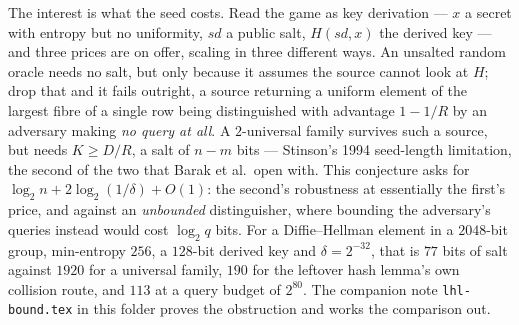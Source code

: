 \documentclass{aicr-conjecture}
\newcommand{\sd}{\mathit{sd}}
\begin{document}
\medskip
\noindent
The interest is what the seed costs. Read the game as key derivation --- $x$ a secret with entropy
but no uniformity, $\sd$ a public salt, $H(\sd,x)$ the derived key --- and three prices are on
offer, scaling in three different ways. An unsalted random oracle needs no salt, but only because
it assumes the source cannot look at $H$; drop that and it fails outright, a source returning a
uniform element of the largest fibre of a single row being distinguished with advantage $1 - 1/R$
by an adversary making \emph{no query at all}. A $2$-universal family survives such a source, but
needs $K \ge D/R$, a salt of $n - m$ bits --- Stinson's 1994 seed-length limitation, the second of
the two that Barak et al.\ open with. This conjecture asks for
$\log_2 n + 2\log_2(1/\delta) + O(1)$: the second's robustness at essentially the first's price,
and against an \emph{unbounded} distinguisher, where bounding the adversary's queries instead would
cost $\log_2 q$ bits. For a Diffie--Hellman element in a $2048$-bit group, min-entropy $256$, a
$128$-bit derived key and $\delta = 2^{-32}$, that is $77$ bits of salt against $1920$ for a
universal family, $190$ for the leftover hash lemma's own collision route, and $113$ at a query
budget of $2^{80}$. The companion note \texttt{lhl-bound.tex} in this folder proves the obstruction
and works the comparison out.
\end{document}
